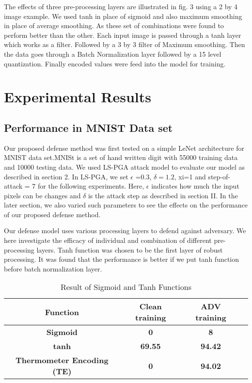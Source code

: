 \documentclass[conference]{IEEEtran}
\begin{document}
The effects of three pre-processing layers are illustrated in fig. 3 using a 2 by 4 image example. We used tanh in place of sigmoid and also maximum smoothing in place of average smoothing. As these set of combinations were found to perform better than the other. Each input image is passed through a tanh layer which works as a filter. Followed by a 3 by 3 filter of Maximum smoothing. Then the data goes through a Batch Normalization layer followed by a 15 level quantization. Finally encoded values were feed into the model for training.

\section{Experimental Results}\subsection{Performance in MNIST Data set}

Our proposed defense method was first tested on a simple LeNet architecture for MNIST data set.MNISt is a set of hand written digit with 55000 training data and 10000 testing data. We used LS-PGA attack model to evaluate our model as described in section 2. In LS-PGA, we set $\epsilon$ =0.3, $\delta=1.2$, xi=1 and step-of-attack = 7 for the following experiments. Here, $\epsilon$ indicates how much the input pixels can be changes and $\delta$ is the attack step as described in section II.  In the later section, we also varied such parameters to see the effects on the performance of our proposed defense method.

Our defense model uses various processing layers to defend against adversary. We here investigate the efficacy of individual and combination of different pre-processing layers. Tanh function was chosen to be the first layer of  robust processing. It was found that the performance is better if we put tanh function before batch normalization layer. 
\begin{table}[h]
\centering
\caption{Result of Sigmoid and Tanh Functions}
\label{coding}
\begin{tabular}{@{}cccc@{}}
\toprule
\textbf{Function}  & \textbf{Clean training} & \textbf{ADV training} \\ \midrule
\textbf{Sigmoid} & \textbf{0} & \textbf{8} \\ \midrule
\textbf{tanh} & \textbf{69.55} & \textbf{94.42} \\ 
\bottomrule
\textbf{Thermometer Encoding (TE)} & \textbf{0 } & \textbf{94.02} \\ 
\bottomrule
\end{tabular}
\end{table}
\end{document}
